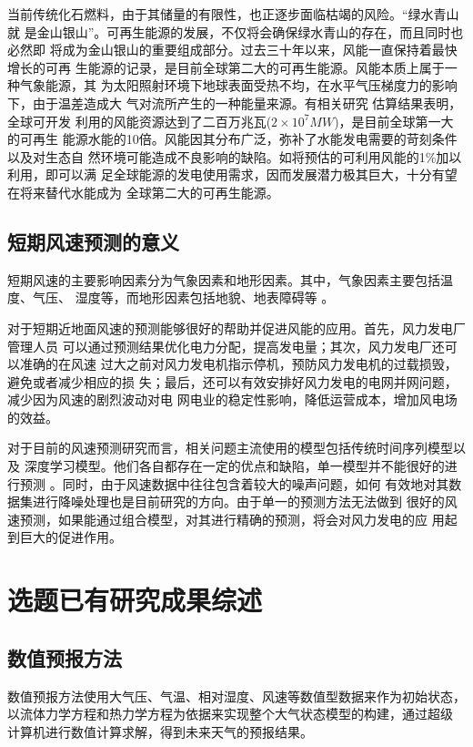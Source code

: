 \documentclass[AutoFakeBold]{LZUThesis}
\begin{document}
当前传统化石燃料，由于其储量的有限性，也正逐步面临枯竭的风险。“绿水青山就
是金山银山”。可再生能源的发展，不仅将会确保绿水青山的存在，而且同时也必然即
将成为金山银山的重要组成部分。过去三十年以来，风能一直保持着最快增长的可再
生能源的记录，是目前全球第二大的可再生能源。风能本质上属于一种气象能源，其
为太阳照射环境下地球表面受热不均，在水平气压梯度力的影响下，由于温差造成大
气对流所产生的一种能量来源。有相关研究
\cite{李仲蔚2019风力发电企业价值评估研究}估算结果表明，全球可开发
利用的风能资源达到了二百万兆瓦($2\times10^7MW$)，是目前全球第一大的可再生
能源水能的10倍。风能因其分布广泛，弥补了水能发电需要的苛刻条件以及对生态自
然环境可能造成不良影响的缺陷。如将预估的可利用风能的1\%加以利用，即可以满
足全球能源的发电使用需求，因而发展潜力极其巨大，十分有望在将来替代水能成为
全球第二大的可再生能源。

\subsection{短期风速预测的意义}
短期风速的主要影响因素分为气象因素和地形因素。其中，气象因素主要包括温度、气压、
湿度等，而地形因素包括地貌、地表障碍等\cite{王秀2021基于} 。

对于短期近地面风速的预测能够很好的帮助并促进风能的应用。首先，风力发电厂管理人员
可以通过预测结果优化电力分配，提高发电量；其次，风力发电厂还可以准确的在风速
过大之前对风力发电机指示停机，预防风力发电机的过载损毁，避免或者减少相应的损
失；最后，还可以有效安排好风力发电的电网并网问题，减少因为风速的剧烈波动对电
网电业的稳定性影响，降低运营成本，增加风电场的效益。

对于目前的风速预测研究而言，相关问题主流使用的模型包括传统时间序列模型以及
深度学习模型。他们各自都存在一定的优点和缺陷，单一模型并不能很好的进行预测
\cite{陆冰鉴2020基于}。同时，由于风速数据中往往包含着较大的噪声问题，如何
有效地对其数据集进行降噪处理也是目前研究的方向。由于单一的预测方法无法做到
很好的风速预测，如果能通过组合模型，对其进行精确的预测，将会对风力发电的应
用起到巨大的促进作用。

\section{选题已有研究成果综述}
\subsection{数值预报方法}
数值预报方法使用大气压、气温、相对湿度、风速等数值型数据来作为初始状态，
以流体力学方程和热力学方程为依据来实现整个大气状态模型的构建，通过超级
计算机进行数值计算求解，得到未来天气的预报结果。
\cite{姜兆宇2019多时空尺度的风力发电预测方法综述}
\end{document}

